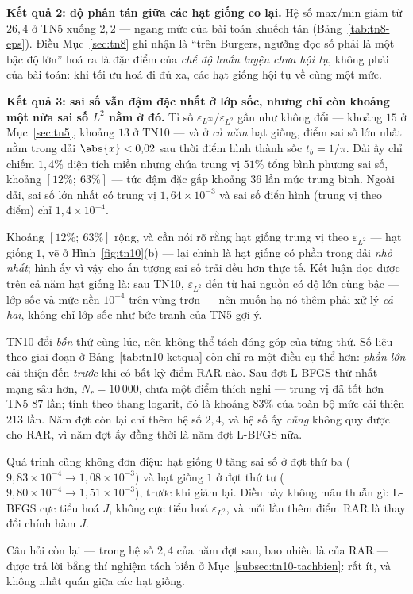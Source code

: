 \textbf{Kết quả 2: độ phân tán giữa các hạt giống co lại.} Hệ số max/min giảm từ
$26{,}4$ ở TN5 xuống $2{,}2$ --- ngang mức của bài toán khuếch tán
(Bảng~\ref{tab:tn8-eps}). Điều Mục~\ref{sec:tn8} ghi nhận là ``trên Burgers,
ngưỡng đọc số phải là một bậc độ lớn'' hoá ra là đặc điểm của \emph{chế độ huấn
luyện chưa hội tụ}, không phải của bài toán: khi tối ưu hoá đi đủ xa, các hạt
giống hội tụ về cùng một mức.

\textbf{Kết quả 3: sai số vẫn đậm đặc nhất ở lớp sốc, nhưng chỉ còn khoảng một
nửa sai số $L^2$ nằm ở đó.} Tỉ số $\varepsilon_{L^\infty}/\varepsilon_{L^2}$ gần
như không đổi --- khoảng $15$ ở Mục~\ref{sec:tn5}, khoảng $13$ ở TN10 --- và ở
\emph{cả năm} hạt giống, điểm sai số lớn nhất nằm trong dải $\abs{x} < 0{,}02$
sau thời điểm hình thành sốc $t_b = 1/\pi$. Dải ấy chỉ chiếm $1{,}4\%$ diện tích
miền nhưng chứa trung vị $51\%$ tổng bình phương sai số, khoảng
$[12\%;\ 63\%]$ --- tức đậm đặc gấp khoảng $36$ lần mức trung bình. Ngoài dải,
sai số lớn nhất có trung vị $1{,}64\times10^{-3}$ và sai số điển hình (trung vị
theo điểm) chỉ $1{,}4\times10^{-4}$.

Khoảng $[12\%;\ 63\%]$ rộng, và cần nói rõ rằng hạt giống trung vị theo
$\varepsilon_{L^2}$ --- hạt giống $1$, vẽ ở Hình~\ref{fig:tn10}(b) --- lại chính
là hạt giống có phần trong dải \emph{nhỏ nhất}; hình ấy vì vậy cho ấn tượng sai
số trải đều hơn thực tế. Kết luận đọc được trên cả năm hạt giống là: sau TN10,
$\varepsilon_{L^2}$ đến từ hai nguồn có độ lớn cùng bậc --- lớp sốc và mức nền
$10^{-4}$ trên vùng trơn --- nên muốn hạ nó thêm phải xử lý \emph{cả hai}, không
chỉ lớp sốc như bức tranh của TN5 gợi ý.

\begin{nhanxet}
\label{nx:khong-quy-cong-rar}
TN10 đổi \emph{bốn} thứ cùng lúc, nên không thể tách đóng góp của từng thứ. Số
liệu theo giai đoạn ở Bảng~\ref{tab:tn10-ketqua} còn chỉ ra một điều cụ thể hơn:
\emph{phần lớn} cải thiện đến \emph{trước} khi có bất kỳ điểm RAR nào. Sau đợt
L-BFGS thứ nhất --- mạng sâu hơn, $N_r = 10\,000$, chưa một điểm thích nghi ---
trung vị đã tốt hơn TN5 $87$ lần; tính theo thang logarit, đó là khoảng $83\%$
của toàn bộ mức cải thiện $213$ lần. Năm đợt còn lại chỉ thêm hệ số $2{,}4$, và
hệ số ấy \emph{cũng} không quy được cho RAR, vì năm đợt ấy đồng thời là năm đợt
L-BFGS nữa.

Quá trình cũng không đơn điệu: hạt giống $0$ tăng sai số ở đợt thứ ba
($9{,}83\times10^{-4} \to 1{,}08\times10^{-3}$) và hạt giống $1$ ở đợt thứ tư
($9{,}80\times10^{-4} \to 1{,}51\times10^{-3}$), trước khi giảm lại. Điều này
không mâu thuẫn gì: L-BFGS cực tiểu hoá $J$, không cực tiểu hoá
$\varepsilon_{L^2}$, và mỗi lần thêm điểm RAR là thay đổi chính hàm $J$.

Câu hỏi còn lại --- trong hệ số $2{,}4$ của năm đợt sau, bao nhiêu là của RAR
--- được trả lời bằng thí nghiệm tách biến ở
Mục~\ref{subsec:tn10-tachbien}: rất ít, và không nhất quán giữa các hạt giống.
\end{nhanxet}

